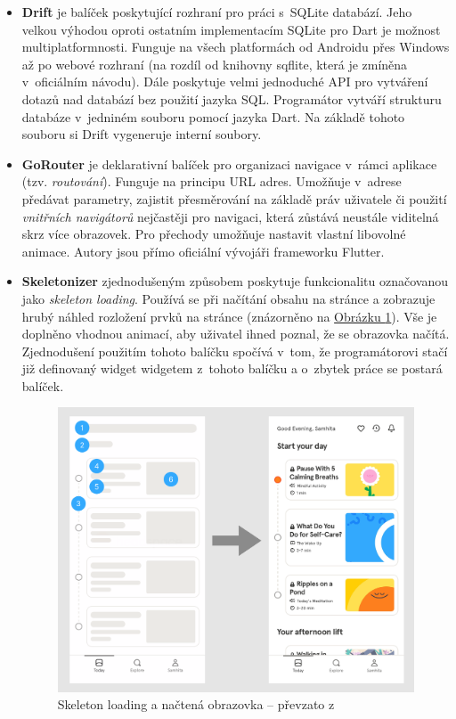 \documentclass[
  biblatex,
  figures=true,
  tables=false,
  glossaries,
  index
]{kidiplom}
\begin{document}
\begin{itemize}
  \item \textbf{Drift} \cite{drift} je balíček poskytující rozhraní pro práci s~SQLite databází. Jeho velkou výhodou oproti ostatním implementacím SQLite pro Dart je možnost multiplatformnosti. Funguje na všech platformách od Androidu přes Windows až po webové rozhraní (na rozdíl od knihovny sqflite, která je zmíněna v~oficiálním návodu). Dále poskytuje velmi jednoduché API pro vytváření dotazů nad databází bez použití jazyka SQL. Programátor vytváří strukturu databáze v~jedniném souboru pomocí jazyka Dart. Na základě tohoto souboru si Drift vygeneruje interní soubory. 
  \item \textbf{GoRouter} \cite{gorouter} je deklarativní balíček pro organizaci navigace v~rámci aplikace (tzv. \textit{routování}). Funguje na principu URL adres. Umožňuje v~adrese předávat parametry, zajistit přesměrování na základě práv uživatele či použití \textit{vnitřních navigátorů} nejčastěji pro navigaci, která zůstává neustále viditelná skrz více obrazovek. Pro přechody umožňuje nastavit vlastní libovolné animace. Autory jsou přímo oficiální vývojáři frameworku Flutter.
  \item \textbf{Skeletonizer} \cite{skeletonizer} zjednodušeným způsobem poskytuje funkcionalitu označovanou jako \textit{skeleton loading}. Používá se při načítání obsahu na stránce a zobrazuje hrubý náhled rozložení prvků na stránce (znázorněno  na \hyperref[fig:skeleton]{Obrázku \ref{fig:skeleton}}). Vše je doplněno vhodnou animací, aby uživatel ihned poznal, že se obrazovka načítá. Zjednodušení použitím tohoto balíčku spočívá v~tom, že programátorovi stačí již definovaný widget  widgetem  z~tohoto balíčku a o~zbytek práce se postará balíček.
  
  \begin{figure}
  	\centering
  	\includegraphics[scale=0.1]{images/skeletonizer.png}
  	\caption{Skeleton loading a načtená obrazovka -- převzato z~\cite{skeleton}}
    \label{fig:skeleton}
  \end{figure}
  

\end{itemize}
\end{document}
